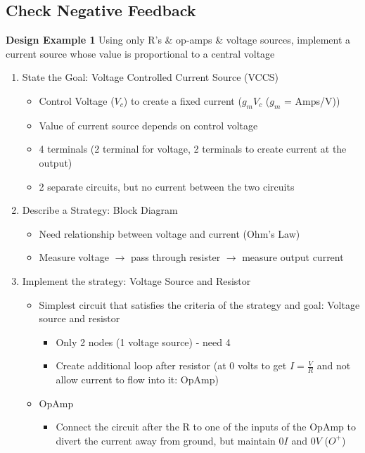 \documentclass{article}\usepackage{amsmath,amssymb,amsthm,tikz,tkz-graph,color,chngpage,soul,hyperref,csquotes,graphicx,floatrow}\newcommand*{\QEDB}{\hfill\ensuremath{\square}}\newtheorem*{prop}{Proposition}\renewcommand{\theenumi}{\alph{enumi}}\usepackage[shortlabels]{enumitem}\usepackage[nobreak=true]{mdframed}\usetikzlibrary{matrix,calc}\MakeOuterQuote{"}\usepackage[margin=0.75in]{geometry} \newtheorem{theorem}{Theorem}
\begin{document}
\subsection*{Check Negative Feedback}
\textbf{Design Example 1}
Using only R's \& op-amps \& voltage sources, implement a current source whose value is proportional to a central voltage
\begin{enumerate}[1.]
    \item State the Goal: Voltage Controlled Current Source (VCCS)
    \begin{itemize}
        \item Control Voltage ($V_c$) to create a fixed current ($g_mV_c$ ($g_m$ = Amps/V))
        \item Value of current source depends on control voltage
        \item 4 terminals (2 terminal for voltage, 2 terminals to create current at the output)
        \item 2 separate circuits, but no current between the two circuits
    \end{itemize}
    \item Describe a Strategy: Block Diagram
    \begin{itemize}
        \item Need relationship between voltage and current (Ohm's Law)
        \item Measure voltage $\rightarrow$ pass through resister $\rightarrow$ measure output current
    \end{itemize}
    \item Implement the strategy: Voltage Source and Resistor
    \begin{itemize}
        \item Simplest circuit that satisfies the criteria of the strategy and goal: Voltage source and resistor
            \begin{itemize}
                \item Only 2 nodes (1 voltage source) - need 4 
                \item Create additional loop after resistor (at 0 volts to get $I = \frac{V}{R}$ and not allow current to flow into it: OpAmp)
             \end{itemize}
        \item OpAmp
            \begin{itemize}
                \item Connect the circuit after the R to one of the inputs of the OpAmp to divert the current away from ground, but maintain $0I$ and $0V$ ($O^+$)

\end{itemize}
\end{itemize}
\end{enumerate}
\end{document}
